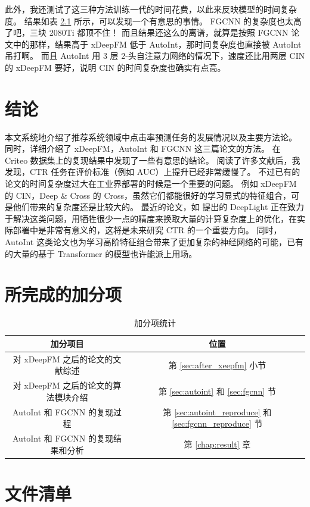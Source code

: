 \documentclass[degree=project,degree-type=project,cjk-font=noto]{thuthesis}
\begin{document}
此外，我还测试了这三种方法训练一代的时间花费，以此来反映模型的时间复杂度。
结果如表 \ref{tab:time_complex} 所示，可以发现一个有意思的事情。
FGCNN 的复杂度也太高了吧，三块 2080Ti 都顶不住！
而且结果还这么的离谱，就算是按照 FGCNN 论文中的那样，结果高于 xDeepFM 低于 AutoInt，那时间复杂度也直接被 AutoInt 吊打啊。
而且 AutoInt 用 3 层 2-头自注意力网络的情况下，速度还比用两层 CIN 的 xDeepFM 要好，说明 CIN 的时间复杂度也确实有点高。

\chapter{结论}

本文系统地介绍了推荐系统领域中点击率预测任务的发展情况以及主要方法论。
同时，详细介绍了 xDeepFM，AutoInt 和 FGCNN 这三篇论文的方法。
在 Criteo 数据集上的复现结果中发现了一些有意思的结论。
阅读了许多文献后，我发现，CTR 任务在评价标准（例如 AUC）上提升已经非常缓慢了。
不过已有的论文的时间复杂度过大在工业界部署的时候是一个重要的问题。
例如 xDeepFM 的 CIN，Deep \& Cross 的 Cross，虽然它们都能很好的学习显式的特征组合，可是他们带来的复杂度还是比较大的。
最近的论文，如 \cite{deeplight} 提出的 DeepLight 正在致力于解决这类问题，用牺牲很少一点的精度来换取大量的计算复杂度上的优化，在实际部署中是非常有意义的，这将是未来研究 CTR 的一个重要方向。
同时，AutoInt 这类论文也为学习高阶特征组合带来了更加复杂的神经网络的可能，已有的大量的基于 Transformer 的模型也许能派上用场。

\chapter{所完成的加分项}

\begin{table}[htb]
  \centering
  \caption{加分项统计}
  \label{tab:time_complex}
  \begin{tabular}{cc}
    \toprule
    \textbf{加分项目}         & \textbf{位置}  \\
    \midrule
    对 xDeepFM 之后的论文的文献综述 & 第 \ref{sec:after_xeepfm} 小节 \\
    对 xDeepFM 之后的论文的算法模块介绍           & 第 \ref{sec:autoint} 和 \ref{sec:fgcnn} 节 \\
    AutoInt 和 FGCNN 的复现过程        & 第 \ref{sec:autoint_reproduce} 和 \ref{sec:fgcnn_reproduce} 节 \\
    AutoInt 和 FGCNN 的复现结果和分析 & 第 \ref{chap:result} 章 \\
    \bottomrule
  \end{tabular}
\end{table}

\backmatter


\appendix

\chapter{文件清单}
\end{document}
